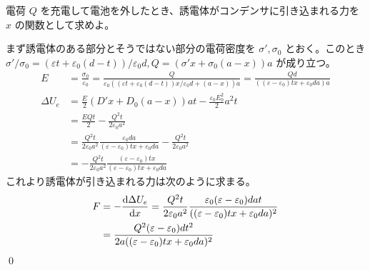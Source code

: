 \documentclass[uplatex,dvipdfmx,a4paper,11pt]{jlreq}
\makeatletter
\numberwithin{equation}{section}
\theoremstyle{definition}
\renewenvironment{proof}[1][\proofname]{\par
  \normalfont
  \topsep6\p@\@plus6\p@ \trivlist
  \item[\hskip\labelsep{\bfseries #1}\@addpunct{\bfseries}]\ignorespaces\quad\par
}{%
  \qed\endtrivlist\@endpefalse
}
\renewcommand\proofname{証明}
\makeatother
\begin{document}
\begin{problem}
電荷 $Q$ を充電して電池を外したとき、誘電体がコンデンサに引き込まれる力を $x$ の関数として求めよ。
\end{problem}
\begin{proof}
  まず誘電体のある部分とそうではない部分の電荷密度を $\sigma', \sigma_0$ とおく。このとき $\sigma'/\sigma_0 = (\varepsilon t + \varepsilon_0(d - t))/\varepsilon_0d, Q = (\sigma'x + \sigma_0(a - x))a$ が成り立つ。
  \begin{align}
    E          & = \frac{\sigma_0}{\varepsilon_0} = \frac{Q}{\varepsilon_0((\varepsilon t + \varepsilon_0(d - t))x/\varepsilon_0d + (a - x))a} = \frac{Qd}{((\varepsilon - \varepsilon_0)tx + \varepsilon_0da)a} \\
    \Delta U_e & = \frac{E}{2}(D'x + D_0(a - x))at - \frac{\varepsilon_0E_0^2}{2}a^2t                                                                                                                            \\
               & = \frac{EQt}{2} - \frac{Q^2t}{2\varepsilon_0a^2}                                                                                                                                                \\
               & = \frac{Q^2t}{2\varepsilon_0a^2}\frac{\varepsilon_0da}{(\varepsilon - \varepsilon_0)tx + \varepsilon_0da} - \frac{Q^2t}{2\varepsilon_0a^2}                                                      \\
               & = -\frac{Q^2t}{2\varepsilon_0a^2}\frac{(\varepsilon - \varepsilon_0)tx}{(\varepsilon - \varepsilon_0)tx + \varepsilon_0da}
  \end{align}
  これより誘電体が引き込まれる力は次のように求まる。
  \begin{align}
    F & = -\diff{\Delta U_e}{x} = \frac{Q^2t}{2\varepsilon_0a^2}\frac{\varepsilon_0(\varepsilon - \varepsilon_0)dat}{((\varepsilon - \varepsilon_0)tx + \varepsilon_0da)^2} \\
      & = \frac{Q^2(\varepsilon - \varepsilon_0)dt^2}{2a((\varepsilon - \varepsilon_0)tx + \varepsilon_0da)^2}                                                              \\
  \end{align}
\end{proof}
\end{document}
